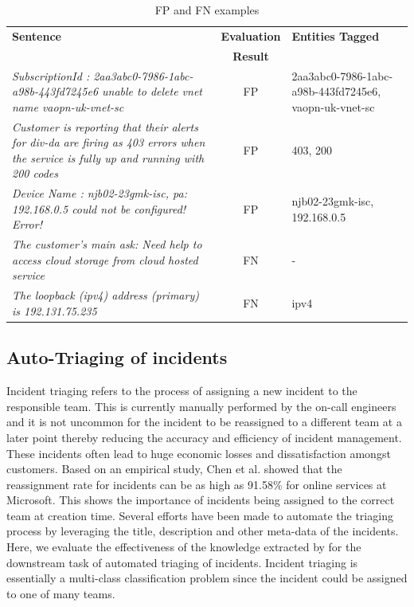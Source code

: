 \begin{table}
\small
\caption{FP and FN examples}\vspace{-6pt}
\label{false-examples}
\begin{tabular}[t]{ p{4cm} c p{2cm}} 
\toprule
\textbf{Sentence} & \textbf{Evaluation} & \textbf{Entities Tagged}\\
 & \textbf{Result} & \\
\midrule
\textit{SubscriptionId : 2aa3abc0-7986-1abc-a98b-443fd7245e6 unable to delete vnet name vaopn-uk-vnet-sc} & FP & {2aa3abc0-7986-1abc-a98b-443fd7245e6, vaopn-uk-vnet-sc }\\

\textit{Customer is reporting that their alerts for div-da are firing as 403 errors when the service is fully up and running with 200 codes} & FP & {403, 200} \\

\textit{Device Name : njb02-23gmk-isc, pa: 192.168.0.5 could not be configured! Error!} & FP & {njb02-23gmk-isc, 192.168.0.5} \\

\textit{The customer's  main ask: Need help to access cloud storage from cloud hosted service}  & FN & - \\

\textit{The loopback (ipv4) address (primary) is 192.131.75.235} & FN & {ipv4} \\
\bottomrule
\end{tabular}
\end{table}

\subsection{Auto-Triaging of incidents}
Incident triaging refers to the process of assigning a new incident to the responsible team. This is currently manually performed by the on-call engineers and it is not uncommon for the incident to be reassigned to a different team at a later point thereby reducing the accuracy and efficiency of incident management. These incidents often lead to huge economic losses and dissatisfaction amongst customers. Based on an empirical study, Chen et al. \cite{EmpiricalIcMICSE2019} showed that the reassignment rate for incidents can be as high as 91.58\% for online services at Microsoft. This shows the importance of incidents being assigned to the correct team at creation time. Several efforts \cite{EmpiricalIcMICSE2019, ContinuousTriageASE2019} have been made to automate the triaging process by leveraging the title, description and other meta-data of the incidents. Here, we evaluate the effectiveness of the knowledge extracted by \softner{} for the downstream task of automated triaging of incidents. Incident triaging is essentially a multi-class classification problem since the incident could be assigned to one of many teams. 

